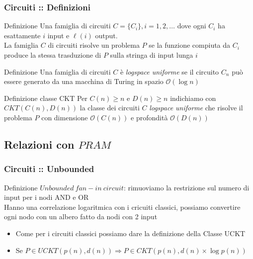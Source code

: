 \documentclass{beamer}
\newcommand{\bigO}{\ensuremath{\mathcal{O}}} %
\begin{document}
\begin{frame}
	\frametitle{Circuiti :: Definizioni} %
	
	\begin{block}{Definizione}
		Una famiglia di circuiti $C = \{C_i\}, i=1,2,\dots$ dove ogni $C_i$ ha esattamente $i$ input e $\ell(i)$ output.\\
		La famiglia $C$ di circuiti risolve un problema $P$ se la funzione compiuta da $C_i$ produce la stessa trasduzione di $P$ sulla stringa di input lunga $i$
	\end{block}
	\begin{block}{Definizione}
		Una famiglia di circuiti $C$ è \emph{logspace uniforme} se il circuito $C_n$ può essere generato da una macchina di Turing in spazio $\bigO{(\log n)}$
	\end{block}
	\begin{block}{Definizione classe CKT}
		Per $C(n) \geq n$ e $D(n) \geq n$ indichiamo con $CKT(C(n),D(n))$ la classe dei circuiti $C$ \emph{logspace uniforme} che risolve il problema $P$ con dimensione $\bigO{(C(n))}$ e profondità $\bigO{(D(n))}$
	\end{block}
\end{frame}


\subsection{Relazioni con $PRAM$}

\begin{frame}
	\frametitle{Circuiti :: Unbounded} %
	\begin{block}{Definizione}
		$Unbounded\ fan-in\ circuit $: rimuoviamo la restrizione sul numero di input per i nodi AND e OR\\
		Hanno una correlazione logaritmica con i cricuiti classici, possiamo convertire ogni nodo con un albero fatto da nodi con 2 input
	\end{block}
	\begin{itemize}
		\item Come per i circuiti classici possiamo dare la definizione della Classe UCKT
		\item Se $P \in UCKT(p(n),d(n)) \Longrightarrow P \in CKT(p(n),d(n) \times \log p(n))$
	\end{itemize}
\end{frame}
\end{document}
